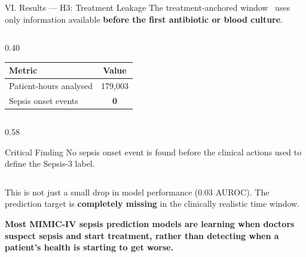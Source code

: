 \begin{frame}{VI. Results --- H3: Treatment Leakage \confirmed}
The treatment-anchored window~\cite{kamran2024evaluation} uses only
information available \textbf{before the first antibiotic or blood culture}.

\vspace{6pt}
\begin{atucols}[c]

\begin{column}{0.40\textwidth}
\begin{center}\tablestyle
\begin{tabular}{lc}
\toprule
\textbf{Metric} & \textbf{Value} \\
\midrule
Patient-hours analysed & 179,003 \\
Sepsis onset events    & \textbf{0} \\
\bottomrule
\end{tabular}
\end{center}
\end{column}

\begin{column}{0.58\textwidth}
\begin{alertblock}{Critical Finding}
  No sepsis onset event is found before the clinical actions used to define
  the Sepsis-3 label.
\end{alertblock}
\end{column}

\end{atucols}

\vspace{6pt}
This is not just a small drop in model performance (0.03 AUROC). The
prediction target is \textbf{completely missing} in the clinically realistic
time window.

\vspace{4pt}
\textbf{Most MIMIC-IV sepsis prediction models are learning when doctors
suspect sepsis and start treatment, rather than detecting when a patient's
health is starting to get worse.}
\end{frame}


